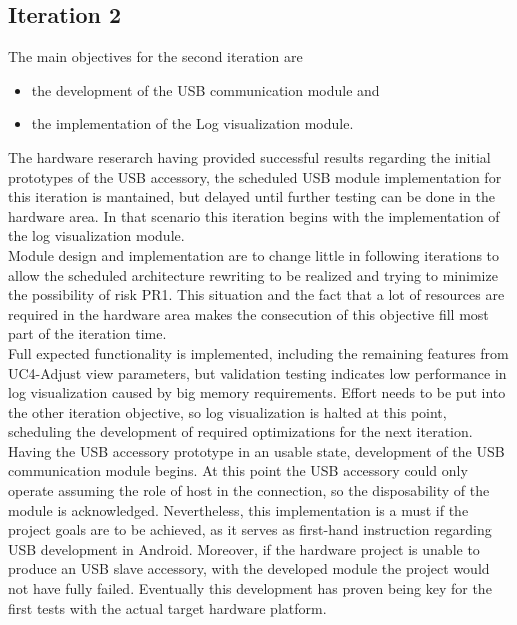 			
		\subsection{Iteration 2}

			The main objectives for the second iteration are
			\begin{itemize} 
				\item the development of the USB communication module and
				\item the implementation of the Log visualization module.
			\end{itemize}

			The hardware reserarch having provided successful results regarding the initial prototypes of the USB accessory, the scheduled USB module implementation for this iteration is mantained, but delayed until further testing can be done in the hardware area.
			In that scenario this iteration begins with the implementation of the log visualization module.\\

			Module design and implementation are to change little in following iterations to allow the scheduled architecture rewriting to be realized and trying to minimize the possibility of risk PR1. This situation and the fact that a lot of resources are required in the hardware area makes the consecution of this objective fill most part of the iteration time.\\

			Full expected functionality is implemented, including the remaining features from UC4-Adjust view parameters, but validation testing indicates low performance in log visualization caused by big memory requirements. Effort needs to be put into the other iteration objective, so log visualization is halted at this point, scheduling the development of required optimizations for the next iteration.\\

			Having the USB accessory prototype in an usable state, development of the USB communication module begins. At this point the USB accessory could only operate assuming the role of host in the connection, so the disposability of the module is acknowledged. Nevertheless, this implementation is a must if the project goals are to be achieved, as it serves as first-hand instruction regarding USB development in Android. Moreover, if the hardware project is unable to produce an USB slave accessory, with the developed module the project would not have fully failed. Eventually this development has proven being key for the first tests with the actual target hardware platform.\\

